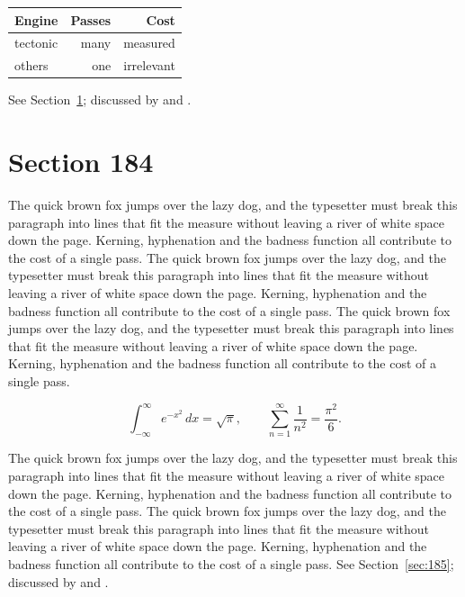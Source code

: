 \documentclass{article}
\begin{document}
\begin{center}
\begin{tabular}{lrr}
\toprule
Engine & Passes & Cost \\
\midrule
tectonic & many & measured \\
others & one & irrelevant \\
\bottomrule
\end{tabular}
\end{center}

See Section~\ref{sec:184}; discussed by \textcite{k4} and \textcite{l1}.
\section{Section 184}
\label{sec:184}
The quick brown fox jumps over the lazy dog, and the typesetter must break this paragraph into lines that fit the measure without leaving a river of white space down the page. Kerning, hyphenation and the badness function all contribute to the cost of a single pass. The quick brown fox jumps over the lazy dog, and the typesetter must break this paragraph into lines that fit the measure without leaving a river of white space down the page. Kerning, hyphenation and the badness function all contribute to the cost of a single pass. The quick brown fox jumps over the lazy dog, and the typesetter must break this paragraph into lines that fit the measure without leaving a river of white space down the page. Kerning, hyphenation and the badness function all contribute to the cost of a single pass. 

\begin{equation}\label{eq:184}
\int_{-\infty}^{\infty} e^{-x^{2}}\,dx = \sqrt{\pi}, \qquad
\sum_{n=1}^{\infty} \frac{1}{n^{2}} = \frac{\pi^{2}}{6}.
\end{equation}

The quick brown fox jumps over the lazy dog, and the typesetter must break this paragraph into lines that fit the measure without leaving a river of white space down the page. Kerning, hyphenation and the badness function all contribute to the cost of a single pass. The quick brown fox jumps over the lazy dog, and the typesetter must break this paragraph into lines that fit the measure without leaving a river of white space down the page. Kerning, hyphenation and the badness function all contribute to the cost of a single pass. 
See Section~\ref{sec:185}; discussed by \textcite{k5} and \textcite{l2}.
\end{document}
